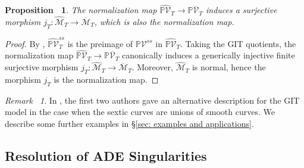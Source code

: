 \documentclass[12pt,reqno,a4paper]{amsart}
\newtheorem{prop}[thm]{Proposition~}
\theoremstyle{remark}
\newtheorem{rmk}[thm]{Remark~}
\theoremstyle{definition}
\newcommand{\CC}{\mathbb{C}}
\newcommand{\PP}{\mathbb{P}}
\newcommand{\calM}{\mathcal{M}}
\newcommand{\calV}{\mathcal{V}}
\newcommand\SL{\mathrm{SL}}
\begin{document}


\begin{prop}
\label{prop: M_T M^bar normalization}
The normalization map $\widehat{\PP\calV}_T \to \PP\overline{\calV}_T$ induces a surjective morphism $j_T\colon \widehat{\calM}_T\to \overline{\calM}_T$, which is also the normalization map.
\end{prop}
\begin{proof}
By \cite[Theorem 1.19]{mumford1994geometric}, $\widehat{\PP\calV}_T^{ss}$ is the preimage of $\PP\calV^{ss}$ in $\widehat{\PP\calV}_T$. Taking the GIT quotients, the normalization map $\widehat{\PP\calV}_T \to \PP\overline{\calV}_T$ canonically induces a generically injective finite surjective morphism $j_T\colon\widehat{\calM}_T \to \overline{\calM}_T$. 
Moreover, $\widehat{\calM}_T$ is normal, hence the morphism $j_T$ is the normalization map.
\end{proof}

\begin{rmk}
In \cite[\S4.2]{yu2023moduli}, the first two authors gave an alternative description for the GIT model in the case when the sextic curves are unions of smooth curves.
We describe some further examples in \S \ref{sec: examples and applications}.
\end{rmk}


\subsection{Resolution of ADE Singularities}
\label{subsection: resolution of ADE}
\end{document}
